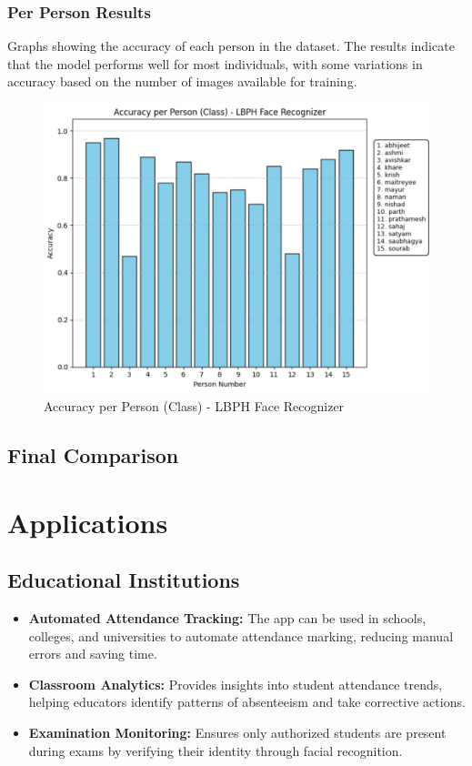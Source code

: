 \documentclass[openany]{report}
\begin{document}
\subsection{Per Person Results}
Graphs showing the accuracy of each person in the dataset. The results indicate that the model performs well for most individuals, with some variations in accuracy based on the number of images available for training.
\begin{figure}[H]
    \centering
    \includegraphics[width=.95\textwidth]{../imgs/accuracy per person.jpg}
    \caption{Accuracy per Person (Class) - LBPH Face Recognizer}
\end{figure}

\section{Final Comparison}

\chapter{Applications}

\section{Educational Institutions}
\begin{itemize}
    \item \textbf{Automated Attendance Tracking:} The app can be used in schools, colleges, and universities to automate attendance marking, reducing manual errors and saving time.
    \item \textbf{Classroom Analytics:} Provides insights into student attendance trends, helping educators identify patterns of absenteeism and take corrective actions.
    \item \textbf{Examination Monitoring:} Ensures only authorized students are present during exams by verifying their identity through facial recognition.
\end{itemize}
\end{document}
